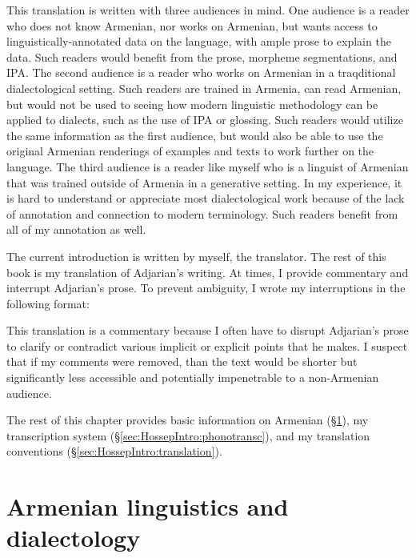 This translation is written with three audiences in mind. One audience is a reader who does not know Armenian, nor works on Armenian, but wants access to linguistically-annotated data on the language, with ample prose to explain the data. Such readers would benefit from the prose, morpheme segmentations, and IPA. The second audience is a reader who works on Armenian in a traqditional dialectological setting. Such readers are trained in Armenia, can read Armenian, but would not be used to seeing how modern linguistic methodology can be applied to dialects, such as the use of IPA or glossing. Such readers would utilize the same information as the first audience, but would also be able to use the original Armenian renderings of examples and texts to work further on the language. The third audience is  a reader like myself who is a linguist of Armenian that was trained outside of Armenia in a generative setting. In my experience, it is hard to understand or appreciate most dialectological work because of the lack of annotation and connection to modern terminology. Such readers benefit from all of my annotation as well.   


The current introduction is written by myself, the translator. The rest of this book is my translation of Adjarian's writing. At times, I provide commentary and interrupt Adjarian's prose. To prevent ambiguity, I wrote my interruptions in the following format:

\begin{center}
\end{center}

This translation is a commentary because I often have to disrupt Adjarian's prose to clarify or contradict various implicit or explicit points that he makes. I suspect that if my comments were removed, than the text would be shorter but significantly less accessible and potentially impenetrable to a non-Armenian audience. 




The rest of this chapter provides basic information on Armenian (\S\ref{sec:HossepIntro:armenian}), my transcription system (\S\ref{sec:HossepIntro:phonotransc}),   and my translation conventions (\S\ref{sec:HossepIntro:translation}).





\section{Armenian linguistics and dialectology}\label{sec:HossepIntro:armenian}


